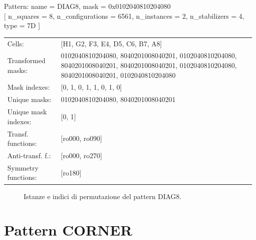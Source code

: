 \begin{tcolorbox}[sharp corners, fontupper=\ttfamily\small, colback=white]
  \noindent Pattern: name = DIAG8, mask = 0x0102040810204080\\
  {[} n\_squares = 8, n\_configurations = 6561,
  n\_instances = 2, n\_stabilizers = 4, type = 7D { ]}\\[1.0ex]
  \begin{tabularx}{\textwidth}{@{} p{3.5cm} X @{}}
    Cells:               & {[}H1, G2, F3, E4, D5, C6, B7, A8{]}\\[0.5ex]
    Transformed masks:   & 0102040810204080, 8040201008040201, 0102040810204080, 8040201008040201, 8040201008040201, 0102040810204080, 8040201008040201, 0102040810204080\\[0.5ex]
    Mask indexes:        & {[}0, 1, 0, 1, 1, 0, 1, 0{]}\\[0.5ex]
    Unique masks:        & 0102040810204080, 8040201008040201\\[0.5ex]
    Unique mask indexes: & {[}0, 1{]}\\[0.5ex]
    Transf. functions:   & {[}ro000, ro090{]}\\[0.5ex]
    Anti-transf. f.:     & {[}ro000, ro270{]}\\[0.5ex]
    Symmetry functions:  & {[}ro180{]}\\[0.5ex]
  \end{tabularx}
\end{tcolorbox}

\begin{figure}[htbp]
  \centering
   \hfill
   \hfill
   \hfill
  \vspace{0.3cm}
   \hfill
   \hfill
   \hfill
  \caption{Istanze e indici di permutazione del pattern DIAG8.}
\end{figure}

\newpage

\section{Pattern CORNER}

